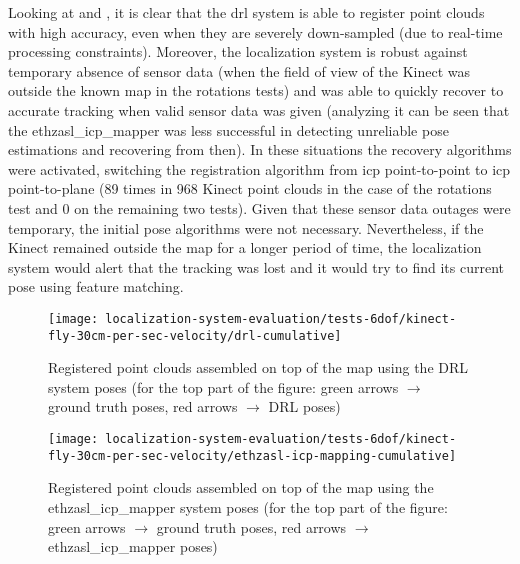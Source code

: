 Looking at  and , it is clear that the \gls{drl} system is able to register point clouds with high accuracy, even when they are severely down-sampled (due to real-time processing constraints). Moreover, the localization system is robust against temporary absence of sensor data (when the field of view of the Kinect was outside the known map in the rotations tests) and was able to quickly recover to accurate tracking when valid sensor data was given (analyzing  it can be seen that the ethzasl\_icp\_mapper was less successful in detecting unreliable pose estimations and recovering from then). In these situations the recovery algorithms were activated, switching the registration algorithm from \gls{icp} point-to-point to \gls{icp} point-to-plane (89 times in 968 Kinect point clouds in the case of the rotations test and 0 on the remaining two tests). Given that these sensor data outages were temporary, the initial pose algorithms were not necessary. Nevertheless, if the Kinect remained outside the map for a longer period of time, the localization system would alert that the tracking was lost and it would try to find its current pose using feature matching.

\begin{figure}[H]
	\centering
	\texttt{[image: localization-system-evaluation/tests-6dof/kinect-fly-30cm-per-sec-velocity/drl-cumulative]}
	\caption{Registered point clouds assembled on top of the map using the DRL system poses (for the top part of the figure: green arrows $\rightarrow$ ground truth poses, red arrows $\rightarrow$ DRL poses)}
	\label{fig:localization-system-evaluation_kinect-fly-30cm-per-sec-velocity-drl-cumulative}
\end{figure}

\begin{figure}[H]
	\centering
	\texttt{[image: localization-system-evaluation/tests-6dof/kinect-fly-30cm-per-sec-velocity/ethzasl-icp-mapping-cumulative]}
	\caption{Registered point clouds assembled on top of the map using the ethzasl\_icp\_mapper system poses (for the top part of the figure: green arrows $\rightarrow$ ground truth poses, red arrows $\rightarrow$ ethzasl\_icp\_mapper poses)}
	\label{fig:localization-system-evaluation_kinect-fly-30cm-per-sec-velocity-ethzasl-icp-mapping-cumulative}
\end{figure}

